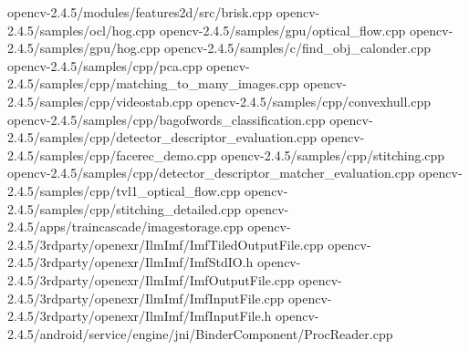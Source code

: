 \documentclass[10pt,a4paper]{article}
\begin{document}
opencv-2.4.5/modules/features2d/src/brisk.cpp \newline
opencv-2.4.5/samples/ocl/hog.cpp \newline
opencv-2.4.5/samples/gpu/optical\_flow.cpp \newline
opencv-2.4.5/samples/gpu/hog.cpp \newline
opencv-2.4.5/samples/c/find\_obj\_calonder.cpp \newline
opencv-2.4.5/samples/cpp/pca.cpp \newline
opencv-2.4.5/samples/cpp/matching\_to\_many\_images.cpp \newline
opencv-2.4.5/samples/cpp/videostab.cpp \newline
opencv-2.4.5/samples/cpp/convexhull.cpp \newline
opencv-2.4.5/samples/cpp/bagofwords\_classification.cpp \newline
opencv-2.4.5/samples/cpp/detector\_descriptor\_evaluation.cpp \newline
opencv-2.4.5/samples/cpp/facerec\_demo.cpp \newline
opencv-2.4.5/samples/cpp/stitching.cpp \newline
opencv-2.4.5/samples/cpp/detector\_descriptor\_matcher\_evaluation.cpp \newline
opencv-2.4.5/samples/cpp/tvl1\_optical\_flow.cpp \newline
opencv-2.4.5/samples/cpp/stitching\_detailed.cpp \newline
opencv-2.4.5/apps/traincascade/imagestorage.cpp \newline
opencv-2.4.5/3rdparty/openexr/IlmImf/ImfTiledOutputFile.cpp \newline
opencv-2.4.5/3rdparty/openexr/IlmImf/ImfStdIO.h \newline
opencv-2.4.5/3rdparty/openexr/IlmImf/ImfOutputFile.cpp \newline
opencv-2.4.5/3rdparty/openexr/IlmImf/ImfInputFile.cpp \newline
opencv-2.4.5/3rdparty/openexr/IlmImf/ImfInputFile.h \newline
opencv-2.4.5/android/service/engine/jni/BinderComponent/ProcReader.cpp \newline
\end{document}
